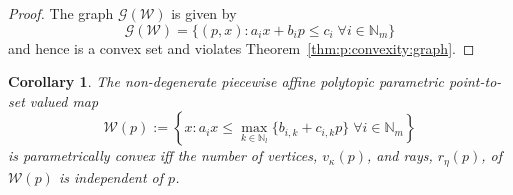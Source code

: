 \documentclass[journal]{IEEEtran}
\newcounter{thmcount}
\newtheorem{cor}[thmcount]{Corollary}
\theoremstyle{remark}
\theoremstyle{definition}
\begin{document}
%
\begin{proof}
The graph $\mathscr G(\mathcal W)$ is given by
%
\begin{equation*}
	\mathscr G(\mathcal W) = \{(p,x):a_i x + b_i p\leq c_i \; \forall i\in\mathbb N_m\}
\end{equation*}
%
and hence is a convex set and violates Theorem~\ref{thm:p:convexity:graph}.
\end{proof}
%
\begin{cor}\label{thm:p:convexity:PWA:set:constant:num:verts}
The non-degenerate piecewise affine polytopic parametric point-to-set valued map 
%
\begin{equation}\label{eq:definition:PWA:polytopic:set:general}
  \mathcal W(p) := \left\{x: a_i x \leq \max_{k\in\mathbb N_l}\{b_{i,k} + c_{i,k}p\} \; \forall i\in\mathbb N_m \right\}
\end{equation}
%
is parametrically convex iff the number of vertices, $v_\kappa(p)$, and rays, $r_\eta(p)$, of $\mathcal W(p)$ is independent of $p$.
\end{cor}
%
\end{document}
